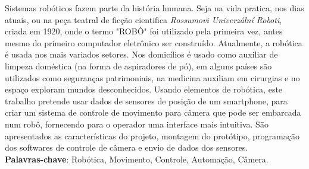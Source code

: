 
\begin{resumo}[RESUMO]
\begin{SingleSpacing}

Sistemas robóticos fazem parte da história humana. Seja na vida pratica, nos dias atuais, ou na peça teatral de ficção cientifica \emph{Rossumovi Univerzální Roboti}, criada em 1920, onde o termo "ROBÔ" foi utilizado pela primeira vez, antes mesmo do primeiro computador eletrônico ser construído.
Atualmente, a robótica é usada nos mais variados setores. Nos domicílios é usado como auxiliar de limpeza doméstica (na forma de aspiradores de pó), em alguns países são utilizados como seguranças patrimoniais, na medicina auxiliam em cirurgias e no espaço exploram mundos desconhecidos. Usando elementos de robótica, este trabalho pretende usar dados de sensores de posição de um smartphone, para criar um sistema de controle de movimento para câmera que pode ser embarcada num robô, fornecendo para o operador uma interface mais intuitiva. São apresentados as características do projeto, montagem do protótipo, programação dos softwares de controle de câmera e envio de dados dos sensores.\\

\textbf{Palavras-chave}: Robótica, Movimento, Controle, Automação, Câmera.

\end{SingleSpacing}
\end{resumo}



